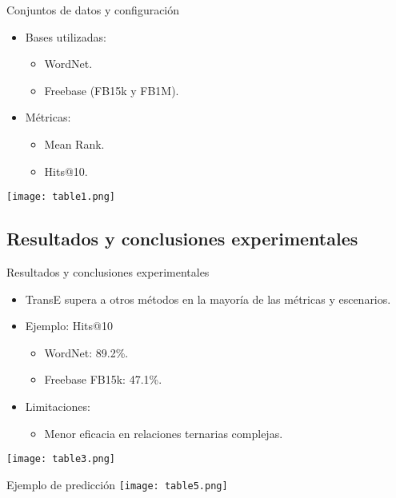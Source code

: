 \documentclass{beamer}
\begin{document}
\begin{frame}{Conjuntos de datos y configuración}
    \begin{itemize}
        \item Bases utilizadas:
        \begin{itemize}
            \item WordNet.
            \item Freebase (FB15k y FB1M).
        \end{itemize}
        \item Métricas:
        \begin{itemize}
            \item Mean Rank.
            \item Hits@10.
        \end{itemize}
    \end{itemize}
    \vspace{0.5cm}
    \centering
    \texttt{[image: table1.png]} %
\end{frame}

\subsection{Resultados y conclusiones experimentales}

\begin{frame}{Resultados y conclusiones experimentales}
    \begin{itemize}
        \item TransE supera a otros métodos en la mayoría de las métricas y escenarios.
        \item Ejemplo: Hits@10
        \begin{itemize}
            \item WordNet: 89.2\%.
            \item Freebase FB15k: 47.1\%.
        \end{itemize}
        \item Limitaciones:
        \begin{itemize}
            \item Menor eficacia en relaciones ternarias complejas.
        \end{itemize}
    \end{itemize}
    \vspace{0.5cm}
    \centering
    \texttt{[image: table3.png]} %
\end{frame}
\begin{frame}{Ejemplo de predicción}
    \vspace{0.5cm}
    \centering
    \texttt{[image: table5.png]} %
\end{frame}
\end{document}
